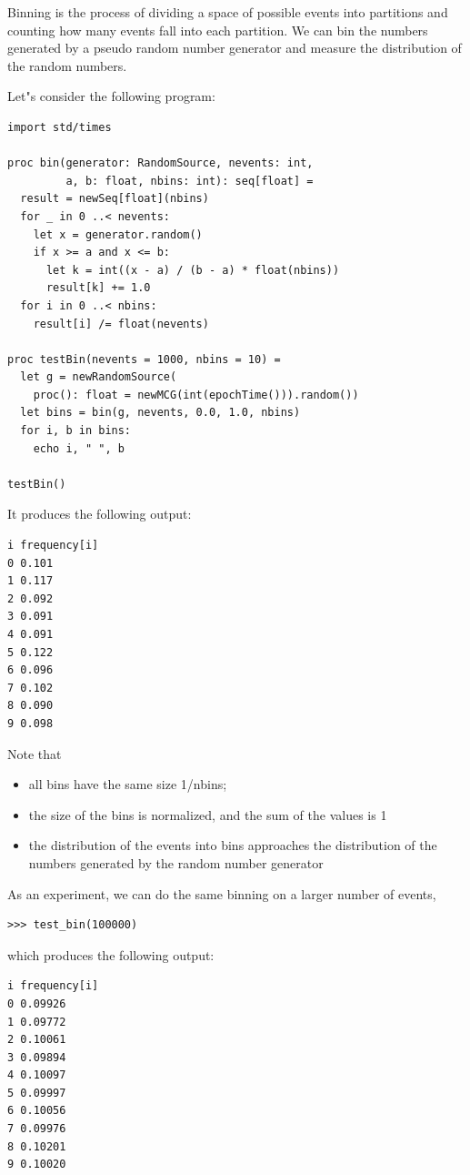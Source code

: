 \documentclass[justified, sixbynine]{tufte-book}
\theoremstyle{plain}%
\newtheorem * {corollary}{Corollary}
\theoremstyle{definition}
\theoremstyle{remark}
\newtheorem * {remark}{Remark}
\newtheorem * {note}{Note}
\begin{document}
\begin{fullwidth}
Binning is the process of dividing a space of possible events into
partitions and counting how many events fall into each partition. We can bin
the numbers generated by a pseudo random number generator and measure the
distribution of the random numbers.

Let"s consider the following program:
\begin{lstlisting}
import std/times

proc bin(generator: RandomSource, nevents: int,
         a, b: float, nbins: int): seq[float] =
  result = newSeq[float](nbins)
  for _ in 0 ..< nevents:
    let x = generator.random()
    if x >= a and x <= b:
      let k = int((x - a) / (b - a) * float(nbins))
      result[k] += 1.0
  for i in 0 ..< nbins:
    result[i] /= float(nevents)

proc testBin(nevents = 1000, nbins = 10) =
  let g = newRandomSource(
    proc(): float = newMCG(int(epochTime())).random())
  let bins = bin(g, nevents, 0.0, 1.0, nbins)
  for i, b in bins:
    echo i, " ", b

testBin()
\end{lstlisting}

It produces the following output:
\begin{lstlisting}
i frequency[i]
0 0.101
1 0.117
2 0.092
3 0.091
4 0.091
5 0.122
6 0.096
7 0.102
8 0.090
9 0.098
\end{lstlisting}

Note that

\begin{itemize}
\item  all bins have the same size 1/nbins;

\item  the size of the bins is normalized, and the sum of the values is 1

\item  the distribution of the events into bins approaches the distribution
of the numbers generated by the random number generator
\end{itemize}

As an experiment, we can do the same binning on a larger number of events, 
\begin{lstlisting}
>>> test_bin(100000)
\end{lstlisting}

which produces the following output:
\begin{lstlisting}
i frequency[i]
0 0.09926
1 0.09772
2 0.10061
3 0.09894
4 0.10097
5 0.09997
6 0.10056
7 0.09976
8 0.10201
9 0.10020
\end{lstlisting}


\end{fullwidth}
\end{document}
